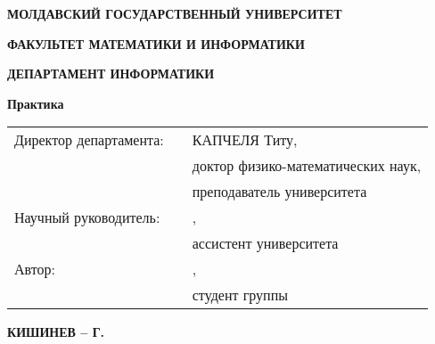 \begin{titlepage}
  \vspace*{\fill}
  \begin{center}
    \vspace*{1cm}

    \large
    \uppercase{\textbf{МОЛДАВСКИЙ ГОСУДАРСТВЕННЫЙ УНИВЕРСИТЕТ  \\}}

    \normalsize
    \uppercase{\textbf{ФАКУЛЬТЕТ МАТЕМАТИКИ И ИНФОРМАТИКИ}}
    \vspace{0.1cm}

    \normalsize
    \uppercase{\textbf{ДЕПАРТАМЕНТ ИНФОРМАТИКИ}}
    \vspace{3.0cm}

    \large
    \textbf{\correctName{\authorNameRu}}
    \vspace{1.5cm}

    \Large
    \textbf{\MakeUppercase{\thesisTitleRu}}
    \vspace{0.75cm}

    \large
    \textbf{\MakeUppercase{\identificatorulCursuluiRu}}
    \vspace{0.5cm}

    \normalsize
    \textbf{Практика}

  \end{center}
  \vfill

  \normalsize

  \begin{flushleft}
    \newcommand{\signatureField}{\textUnderLine{4cm}{(подпись)}}

    \begin{tabular}{p{4.5cm} p{4cm} p{8cm}}
      Директор департамента: & \signatureField{} & КАПЧЕЛЯ Титу, \\
                             &                   & доктор физико-математических наук, \\
                             &                   & преподаватель университета \\
      Научный руководитель:  & \signatureField{} & \correctName{\conducatorNameRu}, \\
                             &                   & ассистент университета \\
      Автор:                 & \signatureField{} & \correctName{\authorNameRu}, \\
                             &                   & студент группы \uniGroupName{} \\
    \end{tabular}

  \end{flushleft}

  \vspace{1cm}

  \begin{center}
    \textbf{КИШИНЕВ -- \year{} Г.}
  \end{center}

\end{titlepage}
